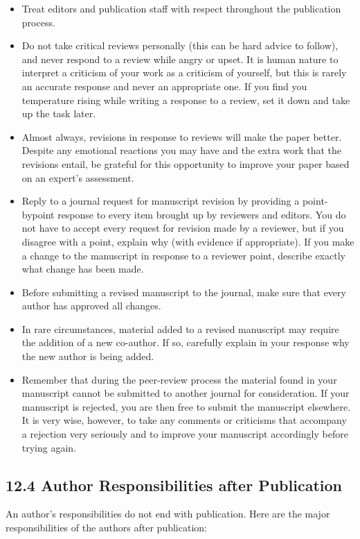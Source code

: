\begin{itemize}
  \item Treat editors and publication staff with respect throughout the publication process.
  \item Do not take critical reviews personally (this can be hard advice to follow), and never respond to a review while angry or upset. It is human nature to interpret a criticism of your work as a criticism of yourself, but this is rarely an accurate response and never an appropriate one. If you find you temperature rising while writing a response to a review, set it down and take up the task later.
  \item Almost always, revisions in response to reviews will make the paper better. Despite any emotional reactions you may have and the extra work that the revisions entail, be grateful for this opportunity to improve your paper based on an expert's assessment.
  \item Reply to a journal request for manuscript revision by providing a point-bypoint response to every item brought up by reviewers and editors. You do not have to accept every request for revision made by a reviewer, but if you disagree with a point, explain why (with evidence if appropriate). If you make a change to the manuscript in response to a reviewer point, describe exactly what change has been made.
  \item Before submitting a revised manuscript to the journal, make sure that every author has approved all changes.
  \item In rare circumstances, material added to a revised manuscript may require the addition of a new co-author. If so, carefully explain in your response why the new author is being added.
  \item Remember that during the peer-review process the material found in your manuscript cannot be submitted to another journal for consideration. If your manuscript is rejected, you are then free to submit the manuscript elsewhere. It is very wise, however, to take any comments or criticisms that accompany a rejection very seriously and to improve your manuscript accordingly before trying again.
\end{itemize}

\subsection*{12.4 Author Responsibilities after Publication}
An author's responsibilities do not end with publication. Here are the major responsibilities of the authors after publication:

